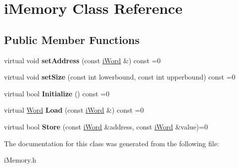 \hypertarget{classiMemory}{
\section{iMemory Class Reference}
\label{classiMemory}
}
\subsection*{Public Member Functions}
\begin{DoxyCompactItemize}
\item 
\hypertarget{classiMemory_a830592088739e3a7d40043f43e72e508}{
virtual void {\bfseries setAddress} (const \hyperlink{classiWord}{iWord} \&) const =0}
\label{classiMemory_a830592088739e3a7d40043f43e72e508}

\item 
\hypertarget{classiMemory_a54415163e0a822be5e50c7f31409993f}{
virtual void {\bfseries setSize} (const int lowerbound, const int upperbound) const =0}
\label{classiMemory_a54415163e0a822be5e50c7f31409993f}

\item 
\hypertarget{classiMemory_aba678668b13277b6ffb1f71efa9d29c4}{
virtual bool {\bfseries Initialize} () const =0}
\label{classiMemory_aba678668b13277b6ffb1f71efa9d29c4}

\item 
\hypertarget{classiMemory_a58fea9cebc1beb89503898d2d5f79bcd}{
virtual \hyperlink{classWord}{Word} {\bfseries Load} (const \hyperlink{classiWord}{iWord} \&) const =0}
\label{classiMemory_a58fea9cebc1beb89503898d2d5f79bcd}

\item 
\hypertarget{classiMemory_affcd8df32bf56b0e585f555eafba86a3}{
virtual bool {\bfseries Store} (const \hyperlink{classiWord}{iWord} \&address, const \hyperlink{classiWord}{iWord} \&value)=0}
\label{classiMemory_affcd8df32bf56b0e585f555eafba86a3}

\end{DoxyCompactItemize}


The documentation for this class was generated from the following file:\begin{DoxyCompactItemize}
\item 
iMemory.h\end{DoxyCompactItemize}
